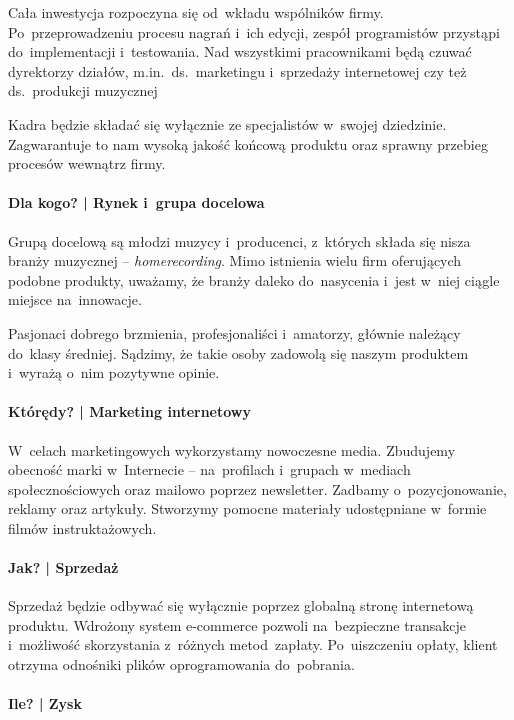 \documentclass[12pt]{article}
\begin{document}
Cała inwestycja rozpoczyna się od~wkładu wspólników firmy.
Po~przeprowadzeniu procesu nagrań i~ich edycji, zespół programistów przystąpi do~implementacji i~testowania.
Nad wszystkimi pracownikami będą czuwać dyrektorzy działów, m.in.~ds.~marketingu i~sprzedaży internetowej czy też ds.~produkcji muzycznej

Kadra będzie składać się wyłącznie ze specjalistów w~swojej dziedzinie.
Zagwarantuje to nam wysoką jakość końcową produktu oraz sprawny przebieg procesów wewnątrz firmy.

\paragraph{Dla kogo? | Rynek i~grupa docelowa}

Grupą docelową są młodzi muzycy i~producenci, z~których składa się nisza branży muzycznej -- \emph{homerecording}.
Mimo istnienia wielu firm oferujących podobne produkty, uważamy, że branży daleko do~nasycenia i~jest w~niej ciągle miejsce na~innowacje.

Pasjonaci dobrego brzmienia, profesjonaliści i~amatorzy, głównie należący do~klasy średniej.
Sądzimy, że takie osoby zadowolą się naszym produktem i~wyrażą o~nim pozytywne opinie.

\paragraph{Którędy? | Marketing internetowy}

W~celach marketingowych wykorzystamy nowoczesne media.
Zbudujemy obecność marki w~Internecie -- na~profilach i~grupach w~mediach społecznościowych oraz mailowo poprzez newsletter.
Zadbamy o~pozycjonowanie, reklamy oraz artykuły.
Stworzymy pomocne materiały udostępniane w~formie filmów instruktażowych.

\paragraph{Jak? | Sprzedaż}

Sprzedaż będzie odbywać się wyłącznie poprzez globalną stronę internetową produktu.
Wdrożony system e-commerce pozwoli na~bezpieczne transakcje i~możliwość skorzystania z~różnych metod~zapłaty.
Po~uiszczeniu opłaty, klient otrzyma odnośniki plików oprogramowania do~pobrania.

\paragraph{Ile? | Zysk}
\end{document}
